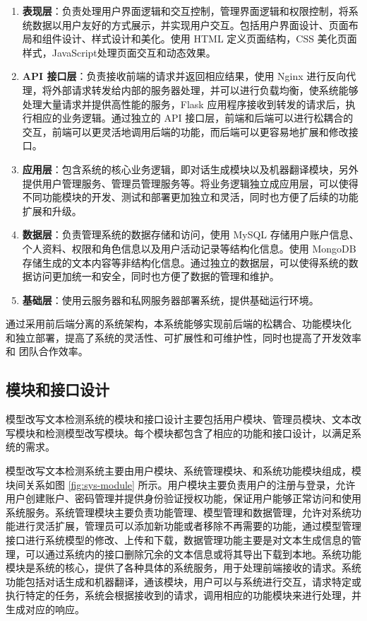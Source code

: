 \begin{enumerate}
\item \textbf{表现层}：负责处理用户界面逻辑和交互控制，管理界面逻辑和权限控制，将系统数据以用户友好的方式展示，并实现用户交互。包括用户界面设计、页面布局和组件设计、样式设计和美化。使用 HTML 定义页面结构，CSS 美化页面样式，JavaScript处理页面交互和动态效果。

\item \textbf{API 接口层}：负责接收前端的请求并返回相应结果，使用 Nginx 进行反向代理，将外部请求转发给内部的服务器处理，并可以进行负载均衡，使系统能够处理大量请求并提供高性能的服务，Flask 应用程序接收到转发的请求后，执行相应的业务逻辑。通过独立的 API 接口层，前端和后端可以进行松耦合的交互，前端可以更灵活地调用后端的功能，而后端可以更容易地扩展和修改接口。

\item \textbf{应用层}：包含系统的核心业务逻辑，即对话生成模块以及机器翻译模块，另外提供用户管理服务、管理员管理服务等。将业务逻辑独立成应用层，可以使得不同功能模块的开发、测试和部署更加独立和灵活，同时也方便了后续的功能扩展和升级。

\item \textbf{数据层}：负责管理系统的数据存储和访问，使用 MySQL 存储用户账户信息、个人资料、权限和角色信息以及用户活动记录等结构化信息。使用 MongoDB 存储生成的文本内容等非结构化信息。通过独立的数据层，可以使得系统的数据访问更加统一和安全，同时也方便了数据的管理和维护。

\item \textbf{基础层}：使用云服务器和私网服务器部署系统，提供基础运行环境。

\end{enumerate}

通过采用前后端分离的系统架构，本系统能够实现前后端的松耦合、功能模块化
和独立部署，提高了系统的灵活性、可扩展性和可维护性，同时也提高了开发效率和
团队合作效率。

\subsection{模块和接口设计}
\label{sec:sys-module}

模型改写文本检测系统的模块和接口设计主要包括用户模块、管理员模块、文本改写模块和检测模型改写模块。每个模块都包含了相应的功能和接口设计，以满足系统的需求。

模型改写文本检测系统主要由用户模块、系统管理模块、和系统功能模块组成，模块间关系如图 \ref{fig:sys-module} 所示。用户模块主要负责用户的注册与登录，允许用户创建账户、密码管理并提供身份验证授权功能，保证用户能够正常访问和使用系统服务。系统管理模块主要负责功能管理、模型管理和数据管理，允许对系统功能进行灵活扩展，管理员可以添加新功能或者移除不再需要的功能，通过模型管理接口进行系统模型的修改、上传和下载，数据管理功能主要是对文本生成信息的管理，可以通过系统内的接口删除冗余的文本信息或将其导出下载到本地。系统功能模块是系统的核心，提供了各种具体的系统服务，用于处理前端接收的请求。系统功能包括对话生成和机器翻译，通该模块，用户可以与系统进行交互，请求特定或执行特定的任务，系统会根据接收到的请求，调用相应的功能模块来进行处理，并生成对应的响应。

